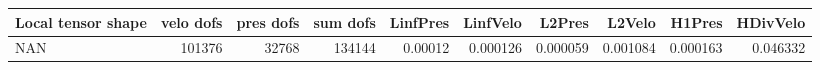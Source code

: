 \begin{tabular}{lrrrrrrrrr}
\toprule
Local tensor shape &  velo dofs &  pres dofs &  sum dofs &  LinfPres &  LinfVelo &   L2Pres &   L2Velo &   H1Pres &  HDivVelo \\
\midrule
               NAN &     101376 &      32768 &    134144 &   0.00012 &  0.000126 & 0.000059 & 0.001084 & 0.000163 &  0.046332 \\
\bottomrule
\end{tabular}
